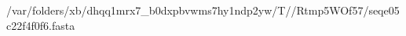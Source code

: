 \documentclass[10pt]{article}
\begin{document}
\begin{texshade}{/var/folders/xb/dhqq1mrx7_b0dxpbvwms7hy1ndp2yw/T//Rtmp5WOf57/seqe05c22f4f0f6.fasta}
\hideconsensus
{}
\hidelogoscale
{}
\showlegend
\end{texshade}
\end{document}
